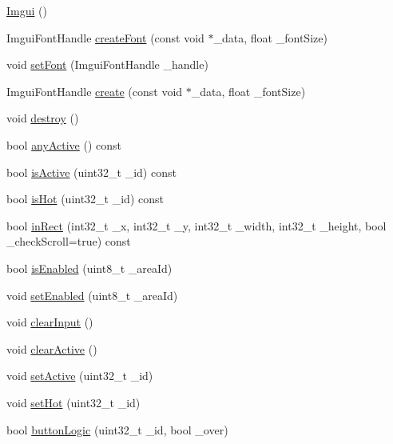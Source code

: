 \begin{DoxyCompactItemize}
\item 
\hyperlink{struct_imgui_a0fd77c8f0d4e05fb61442d6ecc045ede}{Imgui} ()
\item 
Imgui\+Font\+Handle \hyperlink{struct_imgui_aea0d4687353e92f3c38438ccb48af7fe}{create\+Font} (const void $\ast$\+\_\+data, float \+\_\+font\+Size)
\item 
void \hyperlink{struct_imgui_a91b7aa6b3a1343321af148162fad4c5d}{set\+Font} (Imgui\+Font\+Handle \+\_\+handle)
\item 
Imgui\+Font\+Handle \hyperlink{struct_imgui_a9281a868379419f377b474128b283d3d}{create} (const void $\ast$\+\_\+data, float \+\_\+font\+Size)
\item 
void \hyperlink{struct_imgui_a73719120b5edd189cbc3e4693e7527e8}{destroy} ()
\item 
bool \hyperlink{struct_imgui_abd67f8cff4af17d94924459aab78eddc}{any\+Active} () const 
\item 
bool \hyperlink{struct_imgui_a4276ffb8d40339e7f16a6f33660ff845}{is\+Active} (uint32\+\_\+t \+\_\+id) const 
\item 
bool \hyperlink{struct_imgui_ae33b358fd9ca35967d5fa027f0ee070a}{is\+Hot} (uint32\+\_\+t \+\_\+id) const 
\item 
bool \hyperlink{struct_imgui_a77c88bf481d2c6ea655b7b7a3ea0358b}{in\+Rect} (int32\+\_\+t \+\_\+x, int32\+\_\+t \+\_\+y, int32\+\_\+t \+\_\+width, int32\+\_\+t \+\_\+height, bool \+\_\+check\+Scroll=true) const 
\item 
bool \hyperlink{struct_imgui_a74171641f4498920f5ee0c0de99c020c}{is\+Enabled} (uint8\+\_\+t \+\_\+area\+Id)
\item 
void \hyperlink{struct_imgui_a77903dfff9f642acd8758b66e700ac1e}{set\+Enabled} (uint8\+\_\+t \+\_\+area\+Id)
\item 
void \hyperlink{struct_imgui_adf889d7fcbc65d2d9adb8ac1c8dbb826}{clear\+Input} ()
\item 
void \hyperlink{struct_imgui_a82c6855100fb9a94d25f2ce474a7e7dd}{clear\+Active} ()
\item 
void \hyperlink{struct_imgui_aff52f02a457baca3cf4abcb505814d72}{set\+Active} (uint32\+\_\+t \+\_\+id)
\item 
void \hyperlink{struct_imgui_a549bd89ab42007b891884aa2805ee6aa}{set\+Hot} (uint32\+\_\+t \+\_\+id)
\item 
bool \hyperlink{struct_imgui_a21bfcf6ad6f2b1c0ed84337bb4c9b7de}{button\+Logic} (uint32\+\_\+t \+\_\+id, bool \+\_\+over)
\item 

\end{DoxyCompactItemize}
